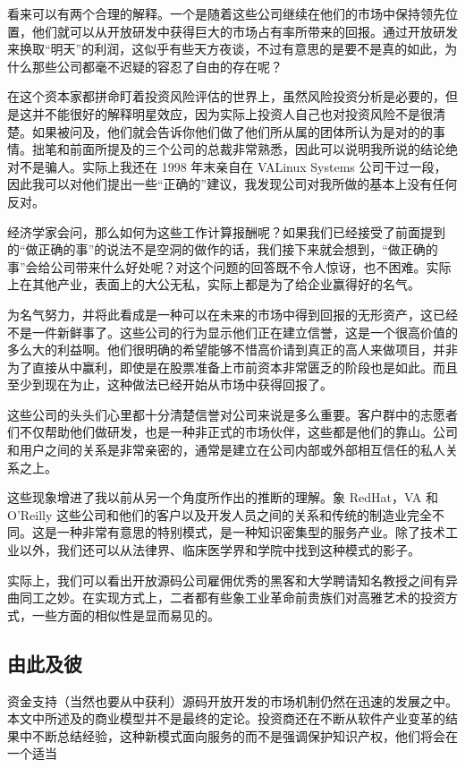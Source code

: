 看来可以有两个合理的解释。一个是随着这些公司继续在他们的市场中保持领先位置，他们就可以从开放研发中获得巨大的市场占有率所带来的回报。通过开放研发来换取“明天”的利润，这似乎有些天方夜谈，不过有意思的是要不是真的如此，为什么那些公司都毫不迟疑的容忍了自由的存在呢？


在这个资本家都拼命盯着投资风险评估的世界上，虽然风险投资分析是必要的，但是这并不能很好的解释明星效应，因为实际上投资人自己也对投资风险不是很清楚。如果被问及，他们就会告诉你他们做了他们所从属的团体所认为是对的的事情。拙笔和前面所提及的三个公司的总裁非常熟悉，因此可以说明我所说的结论绝对不是骗人。实际上我还在 1998 年末亲自在 VALinux Systems 公司干过一段，因此我可以对他们提出一些“正确的”建议，我发现公司对我所做的基本上没有任何反对。


经济学家会问，那么如何为这些工作计算报酬呢？如果我们已经接受了前面提到的“做正确的事”的说法不是空洞的做作的话，我们接下来就会想到，“做正确的事”会给公司带来什么好处呢？对这个问题的回答既不令人惊讶，也不困难。实际上在其他产业，表面上的大公无私，实际上都是为了给企业赢得好的名气。


为名气努力，并将此看成是一种可以在未来的市场中得到回报的无形资产，这已经不是一件新鲜事了。这些公司的行为显示他们正在建立信誉，这是一个很高价值的多么大的利益啊。他们很明确的希望能够不惜高价请到真正的高人来做项目，并非为了直接从中赢利，即使是在股票准备上市前资本非常匮乏的阶段也是如此。而且至少到现在为止，这种做法已经开始从市场中获得回报了。


这些公司的头头们心里都十分清楚信誉对公司来说是多么重要。客户群中的志愿者们不仅帮助他们做研发，也是一种非正式的市场伙伴，这些都是他们的靠山。公司和用户之间的关系是非常亲密的，通常是建立在公司内部或外部相互信任的私人关系之上。


这些现象增进了我以前从另一个角度所作出的推断的理解。象 RedHat，VA 和 O'Reilly 这些公司和他们的客户以及开发人员之间的关系和传统的制造业完全不同。这是一种非常有意思的特别模式，是一种知识密集型的服务产业。除了技术工业以外，我们还可以从法律界、临床医学界和学院中找到这种模式的影子。


实际上，我们可以看出开放源码公司雇佣优秀的黑客和大学聘请知名教授之间有异曲同工之妙。在实现方式上，二者都有些象工业革命前贵族们对高雅艺术的投资方式，一些方面的相似性是显而易见的。

\subsection{由此及彼}
资金支持（当然也要从中获利）源码开放开发的市场机制仍然在迅速的发展之中。本文中所述及的商业模型并不是最终的定论。投资商还在不断从软件产业变革的结果中不断总结经验，这种新模式面向服务的而不是强调保护知识产权，他们将会在一个适当


